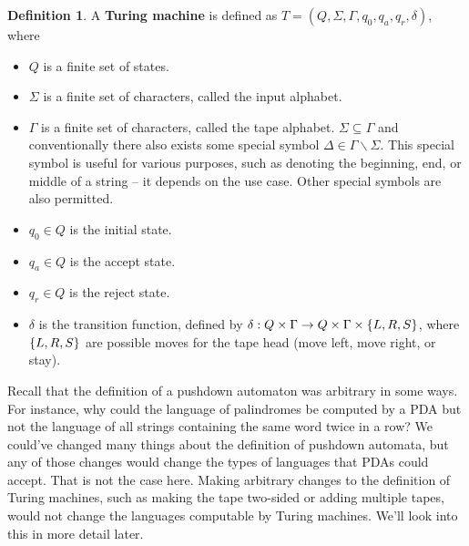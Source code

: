 \documentclass[]{article}
\DeclarePairedDelimiter{\set}{\lbrace}{\rbrace}
\theoremstyle{definition}
\newtheorem*{defn}{Definition}
\begin{document}
      \begin{defn}
        A \textbf{Turing machine} is defined as $T = (Q, \Sigma, \Gamma, q_0, q_a, q_r, \delta)$, where
        \begin{itemize}
          \item $Q$ is a finite set of states.
          \item $\Sigma$ is a finite set of characters, called the input alphabet.
          \item $\Gamma$ is a finite set of characters, called the tape alphabet. $\Sigma \subseteq \Gamma$ and conventionally there also exists some special symbol $\Delta \in \Gamma \backslash \Sigma$. This special symbol is useful for various purposes, such as denoting the beginning, end, or middle of a string -- it depends on the use case. Other special symbols are also permitted.
          \item $q_0 \in Q$ is the initial state.
          \item $q_a \in Q$ is the accept state.
          \item $q_r \in Q$ is the reject state.
          \item $\delta$ is the transition function, defined by $\delta : Q \times \Gamma \to Q \times \Gamma \times \set{L, R, S}$, where $\set{L, R, S}$ are possible moves for the tape head (move left, move right, or stay).
        \end{itemize}
      \end{defn}

      Recall that the definition of a pushdown automaton was arbitrary in some ways. For instance, why could the language of palindromes be computed by a PDA but not the language of all strings containing the same word twice in a row? We could've changed many things about the definition of pushdown automata, but any of those changes would change the types of languages that PDAs could accept. That is not the case here. Making arbitrary changes to the definition of Turing machines, such as making the tape two-sided or adding multiple tapes, would not change the languages computable by Turing machines. We'll look into this in more detail later.
\end{document}
